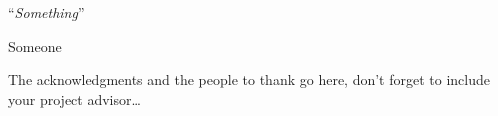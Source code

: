 \documentclass[
11pt, %
english, %
singlespacing, %
headsepline, %
]{MastersDoctoralThesis} %
\begin{document}
\cleardoublepage


\vspace*{0.2\textheight}

\noindent\enquote{\itshape Something}\bigbreak

\hfill Someone


\begin{abstract}
\addchaptertocentry{\abstractname} %
The Thesis Abstract is written here (and usually kept to just this page). The page is kept centered vertically so can expand into the blank space above the title too\ldots
\end{abstract}


\begin{acknowledgements}
\addchaptertocentry{\acknowledgementname} %
The acknowledgments and the people to thank go here, don't forget to include your project advisor\ldots
\end{acknowledgements}


\tableofcontents %

\listoffigures %

\listoftables %

\end{document}
